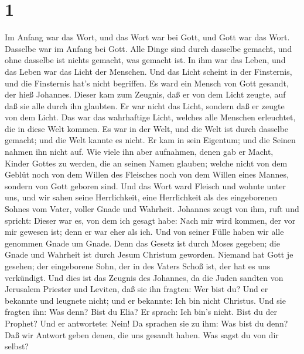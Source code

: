 \hypertarget{section}{%
\section{1}\label{section}}

 Im Anfang war das Wort, und das Wort war bei Gott, und Gott
war das Wort.  Dasselbe war im Anfang bei Gott. 
Alle Dinge sind durch dasselbe gemacht, und ohne dasselbe ist nichts
gemacht, was gemacht ist.  In ihm war das Leben, und das
Leben war das Licht der Menschen.  Und das Licht scheint in
der Finsternis, und die Finsternis hat's nicht begriffen. 
Es ward ein Mensch von Gott gesandt, der hieß Johannes. 
Dieser kam zum Zeugnis, daß er von dem Licht zeugte, auf daß sie alle
durch ihn glaubten.  Er war nicht das Licht, sondern daß er
zeugte von dem Licht.  Das war das wahrhaftige Licht,
welches alle Menschen erleuchtet, die in diese Welt kommen.
 Es war in der Welt, und die Welt ist durch dasselbe
gemacht; und die Welt kannte es nicht.  Er kam in sein
Eigentum; und die Seinen nahmen ihn nicht auf.  Wie viele
ihn aber aufnahmen, denen gab er Macht, Kinder Gottes zu werden, die an
seinen Namen glauben;  welche nicht von dem Geblüt noch von
dem Willen des Fleisches noch von dem Willen eines Mannes, sondern von
Gott geboren sind.  Und das Wort ward Fleisch und wohnte
unter uns, und wir sahen seine Herrlichkeit, eine Herrlichkeit als des
eingeborenen Sohnes vom Vater, voller Gnade und Wahrheit. 
Johannes zeugt von ihm, ruft und spricht: Dieser war es, von dem ich
gesagt habe: Nach mir wird kommen, der vor mir gewesen ist; denn er war
eher als ich.  Und von seiner Fülle haben wir alle genommen
Gnade um Gnade.  Denn das Gesetz ist durch Moses gegeben;
die Gnade und Wahrheit ist durch Jesum Christum geworden. 
Niemand hat Gott je gesehen; der eingeborene Sohn, der in des Vaters
Schoß ist, der hat es uns verkündigt.  Und dies ist das
Zeugnis des Johannes, da die Juden sandten von Jerusalem Priester und
Leviten, daß sie ihn fragten: Wer bist du?  Und er bekannte
und leugnete nicht; und er bekannte: Ich bin nicht Christus.
 Und sie fragten ihn: Was denn? Bist du Elia? Er sprach:
Ich bin's nicht. Bist du der Prophet? Und er antwortete: Nein!
 Da sprachen sie zu ihm: Was bist du denn? Daß wir Antwort
geben denen, die uns gesandt haben. Was sagst du von dir selbst?
